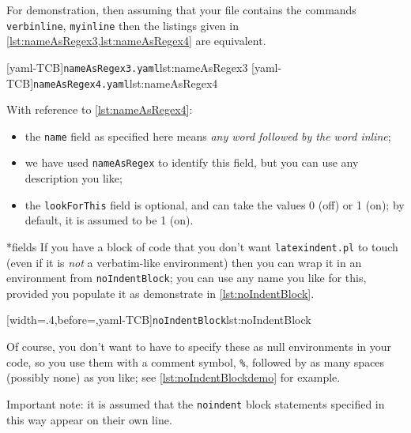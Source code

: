  \begin{example}
 For demonstration, then assuming that your file contains the commands
 \texttt{verbinline}, \texttt{myinline} then the listings given in
 \cref{lst:nameAsRegex3,lst:nameAsRegex4} are equivalent.

 \begin{cmhtcbraster}[raster column skip=.1\linewidth]
  [yaml-TCB]{\texttt{nameAsRegex3.yaml}}{lst:nameAsRegex3}
  [yaml-TCB]{\texttt{nameAsRegex4.yaml}}{lst:nameAsRegex4}
 \end{cmhtcbraster}

 With reference to \cref{lst:nameAsRegex4}:
 \begin{itemize}
  \item the \texttt{name} field as specified here means \emph{any word followed by the
        word inline};
  \item we have used \texttt{nameAsRegex} to identify this field, but you can use any
        description you like;
  \item the \texttt{lookForThis} field is optional, and can take the values 0 (off) or 1
        (on); by default, it is assumed to be 1 (on).
 \end{itemize}
 \end{example}

*{fields}
 If you have a block of code that you don't want \texttt{latexindent.pl} to touch (even
 if  it is \emph{not} a verbatim-like environment) then you
 can wrap it in an environment from \texttt{noIndentBlock}; you can use any name you like
 for this, provided you populate it as demonstrate in \cref{lst:noIndentBlock}.

 [width=.4\linewidth,before=\centering,yaml-TCB]{\texttt{noIndentBlock}}{lst:noIndentBlock}

 Of course, you don't want to have to specify these as null environments in your code, so
 you use them with a comment symbol, \lstinline!%!, followed by as many spaces (possibly
 none) as you like; see \cref{lst:noIndentBlockdemo} for example.


 Important note: it is assumed that the \texttt{noindent} block statements specified in
 this way appear on their own line.

